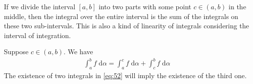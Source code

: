 \documentclass[thmcnt=section, 12pt]{elegantbook}
\begin{document}

\par If we divide the interval $[a, b]$ into two parts with some point $c \in (a, b)$ in the middle, then the integral over the entire interval is the sum of the integrals on these two sub-intervals. This is also a kind of linearity of integrals considering the interval of integration. 

\begin{lemma}
    Suppose $c \in (a, b)$. We have 
    \begin{align}
        \int_a^b f \; \mathrm{d}\alpha
        = \int_a^c f \; \mathrm{d}\alpha
        + \int_c^b f \; \mathrm{d}\alpha
        \label{eq:52}
    \end{align}
    The existence of two integrals in \eqref{eq:52} will imply the existence of the third one.
\end{lemma}
\end{document}
